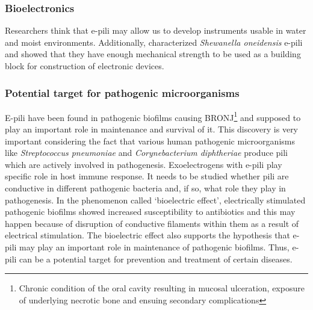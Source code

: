 \documentclass[fontsize=12pt,headsepline=true, bibliography=totocnumbered, twoside]{scrbook} %
\begin{document}
\vspace{0.5cm}

\subsubsection{Bioelectronics}



Researchers think that e-pili may allow us to develop instruments usable in water and moist environments\citep{malvankar2012microbial}. Additionally, \citet{leung2011bacterial} characterized \textit{Shewanella oneidensis} e-pili and showed that they have enough mechanical strength  to be used as a building block for construction of electronic devices\citep{sure2016microbial}.



\vspace{0.5cm}

\subsubsection{Potential target for pathogenic microorganisms }




E-pili have been found in pathogenic biofilms causing \ac{BRONJ}\footnote{Chronic condition of the oral cavity resulting in mucosal ulceration, exposure of underlying necrotic bone and ensuing secondary complications\citep{payne2017worry}} and supposed to play an important role in maintenance and survival of it. This discovery is very important considering the fact that various human pathogenic microorganisms like \textit{ Streptococcus pneumoniae} and \textit{Corynebacterium diphtheriae} produce pili which are actively involved in pathogenesis\citep{soriani2010relevance}. Exoelectrogens with e-pili play specific role in host immune response. It needs to be studied whether pili are conductive in different pathogenic bacteria and, if so, what role they play in pathogenesis. In the phenomenon called `bioelectric effect’, electrically stimulated pathogenic biofilms showed increased susceptibility to antibiotics and this may happen because of disruption of conductive filaments within them as a result of electrical stimulation\citep{wanger2013electrically}. The bioelectric effect also supports the hypothesis that e-pili may play an important role in maintenance of pathogenic biofilms. Thus, e-pili can be a potential target for prevention and treatment of certain diseases\citep{sure2016microbial}.
\end{document}
